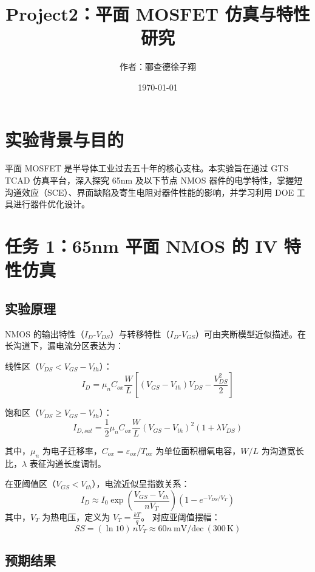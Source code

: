 \documentclass[11pt, a4paper, UTF8]{article}
\title{Project2：平面 MOSFET 仿真与特性研究}
\author{作者：郦查德\hspace{0.5em}徐子翔}
\date{\today}
\begin{document}
\maketitle

\section{实验背景与目的}
平面 MOSFET 是半导体工业过去五十年的核心支柱。本实验旨在通过 GTS TCAD 仿真平台，深入探究 65nm 及以下节点 NMOS 器件的电学特性，掌握短沟道效应（SCE）、界面缺陷及寄生电阻对器件性能的影响，并学习利用 DOE 工具进行器件优化设计。

\section{任务 1：65nm 平面 NMOS 的 IV 特性仿真}
\subsection{实验原理}
NMOS 的输出特性（$I_D$-$V_{DS}$）与转移特性（$I_D$-$V_{GS}$）可由夹断模型近似描述。在长沟道下，漏电流分区表达为：

线性区（$V_{DS}<V_{GS}-V_{th}$）：
\begin{equation}
I_D=\mu_n C_{ox}\frac{W}{L}\left[(V_{GS}-V_{th})V_{DS}-\frac{V_{DS}^2}{2}\right]
\end{equation}

饱和区（$V_{DS}\ge V_{GS}-V_{th}$）：
\begin{equation}
I_{D,sat}=\frac{1}{2}\mu_n C_{ox}\frac{W}{L}(V_{GS}-V_{th})^2(1+\lambda V_{DS})
\end{equation}

其中，$\mu_n$ 为电子迁移率，$C_{ox}=\varepsilon_{ox}/T_{ox}$ 为单位面积栅氧电容，$W/L$ 为沟道宽长比，$\lambda$ 表征沟道长度调制。

在亚阈值区（$V_{GS}<V_{th}$），电流近似呈指数关系：
\begin{equation}
I_D\approx I_0\exp\left(\frac{V_{GS}-V_{th}}{nV_T}\right)\left(1-e^{-V_{DS}/V_T}\right)
\end{equation}
其中，$V_T$ 为热电压，定义为 $V_T=\frac{kT}{q}$。
对应亚阈值摆幅：
\begin{equation}
SS=(\ln 10)\,nV_T\approx 60n\ \text{mV/dec}\ (300\,\text{K})
\end{equation}


\subsection{预期结果}
\end{document}
